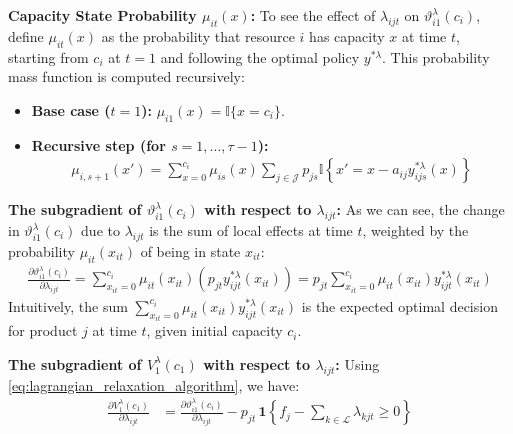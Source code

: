 \documentclass[11pt]{article}
\begin{document}
{\noindent
\textbf{Capacity State Probability $\mu_{it}(x)$:}
To see the effect of $\lambda_{ijt}$ on $\vartheta^\lambda_{i1}(c_i)$, define $\mu_{it}(x)$ as the probability that resource $i$ has capacity $x$ at time $t$, starting from $c_i$ at $t=1$ and following the optimal policy $y^{*\lambda}$. This probability mass function is computed recursively:
\begin{itemize}
    \item \textbf{Base case ($t=1$):} $\mu_{i1}(x) = \mathbb{I}\{x = c_i\}$.
    \item \textbf{Recursive step (for $s=1, \ldots, \tau-1$):}
    \begin{align*}
    \mu_{i,s+1}(x') = \sum_{x=0}^{c_{i}} \mu_{is}(x) \sum_{j \in \mathcal{J}} p_{js} \mathbb{I}\left\{x' = x - a_{ij}y^{*\lambda}_{ijs}(x)\right\}
    \end{align*}
\end{itemize}

\vspace{0.5cm}

\noindent
\textbf{The subgradient of $\vartheta^\lambda_{i1}(c_i)$ with respect to $\lambda_{ijt}$:}
As we can see, the change in $\vartheta^\lambda_{i1}(c_i)$ due to $\lambda_{ijt}$ is the sum of local effects at time $t$, weighted by the probability $\mu_{it}(x_{it})$ of being in state $x_{it}$:
\begin{align*}
\frac{\partial \vartheta^\lambda_{i1}(c_i)}{\partial \lambda_{ijt}} = \sum_{x_{it}=0}^{c_{i}} \mu_{it}(x_{it}) \left( p_{jt} y^{*\lambda}_{ijt}(x_{it}) \right) = p_{jt} \sum_{x_{it}=0}^{c_{i}} \mu_{it}(x_{it}) y^{*\lambda}_{ijt}(x_{it})
\end{align*}
Intuitively, the sum $\sum_{x_{it}=0}^{c_{i}} \mu_{it}(x_{it}) y^{*\lambda}_{ijt}(x_{it})$ is the expected optimal decision for product $j$ at time $t$, given initial capacity $c_i$.

\vspace{0.5cm}

\noindent
\textbf{The subgradient of $V^{\lambda}_{1}(c_{1})$ with respect to $\lambda_{ijt}$:}
Using \eqref{eq:lagrangian_relaxation_algorithm}, we have: 
\begin{align*}
    \frac{\partial V^{\lambda}_{1}(c_{1})}{\partial \lambda_{ijt}} 
    &= \frac{\partial \vartheta^\lambda_{i1}(c_{i})}{\partial \lambda_{ijt}} 
    - p_{jt} \,\mathbf{1}\left\{f_j - \sum_{k \in \mathcal{L}} \lambda_{kjt} \ge 0\right\} 
\end{align*}

}%
\end{document}

